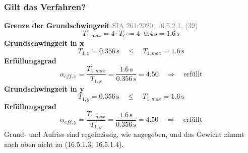 \documentclass[11pt,a4paper]{article}
\newcommand{\normref}[1]{{\small\textcolor{gray}{#1}}}
\begin{document}
\subsubsection{Gilt das Verfahren?}
\noindent\textbf{Grenze der Grundschwingzeit} \hfill \normref{SIA 261:2020, 16.5.2.1, (39)}
\begin{equation*}
T_{1,max} = 4 \cdot T_C = 4 \cdot 0.4\,\mathrm{s} = 1.6\,\mathrm{s}
\end{equation*}
\noindent\textbf{Grundschwingzeit in x}
\begin{equation*}
T_{1,x} = 0.356\,\mathrm{s} \quad \le \quad T_{1,max} = 1.6\,\mathrm{s}
\end{equation*}
\noindent\textbf{Erfüllungsgrad}
\begin{equation*}
\alpha_{eff,x} = \frac{T_{1,max}}{T_{1,x}} = \frac{1.6\,\mathrm{s}}{0.356\,\mathrm{s}} = 4.50 \quad \Rightarrow \quad \text{erfüllt}
\end{equation*}
\noindent\textbf{Grundschwingzeit in y}
\begin{equation*}
T_{1,y} = 0.356\,\mathrm{s} \quad \le \quad T_{1,max} = 1.6\,\mathrm{s}
\end{equation*}
\noindent\textbf{Erfüllungsgrad}
\begin{equation*}
\alpha_{eff,y} = \frac{T_{1,max}}{T_{1,y}} = \frac{1.6\,\mathrm{s}}{0.356\,\mathrm{s}} = 4.50 \quad \Rightarrow \quad \text{erfüllt}
\end{equation*}
Grund- und Aufriss sind regelmässig, wie angegeben, und das Gewicht nimmt nach oben nicht zu (16.5.1.3, 16.5.1.4).
\end{document}
